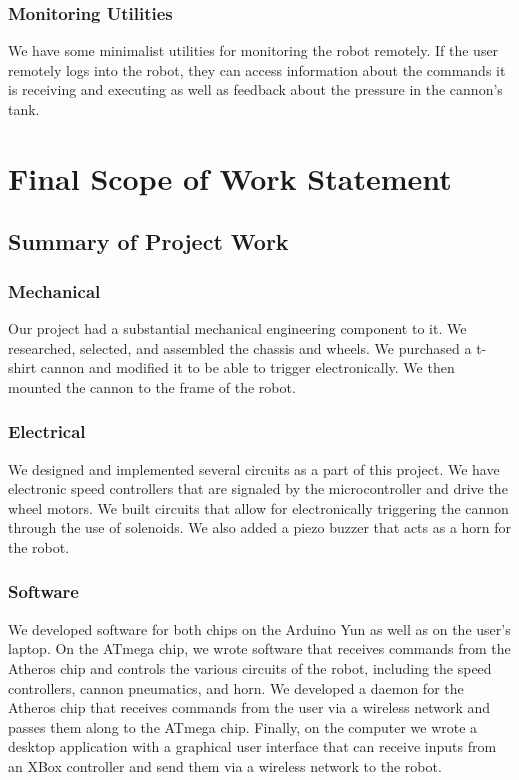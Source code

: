\documentclass[letterpaper,12pt]{article}
\begin{document}
\subsubsection{Monitoring Utilities}
We have some minimalist utilities for monitoring the robot remotely. If the user
remotely logs into the robot, they can access information about the commands it
is receiving and executing as well as feedback about the pressure in the
cannon's tank.


\section{Final Scope of Work Statement}
\label{sec:finalscope}

\subsection{Summary of Project Work}
\subsubsection{Mechanical}
Our project had a substantial mechanical engineering component to it. We
researched, selected, and assembled the chassis and wheels. We purchased a
t-shirt cannon and modified it to be able to trigger electronically. We then
mounted the cannon to the frame of the robot.

\subsubsection{Electrical}
We designed and implemented several circuits as a part of this project. We have
electronic speed controllers that are signaled by the microcontroller and drive
the wheel motors. We built circuits that allow for electronically triggering the
cannon through the use of solenoids. We also added a piezo buzzer that acts as a
horn for the robot.

\subsubsection{Software}
We developed software for both chips on the Arduino Yun as well as on the user's
laptop. On the ATmega chip, we wrote software that receives commands from the
Atheros chip and controls the various circuits of the robot, including the speed
controllers, cannon pneumatics, and horn. We developed a daemon for the Atheros
chip that receives commands from the user via a wireless network and passes them
along to the ATmega chip. Finally, on the computer we wrote a desktop
application with a graphical user interface that can receive inputs from an XBox
controller and send them via a wireless network to the robot.
\end{document}
